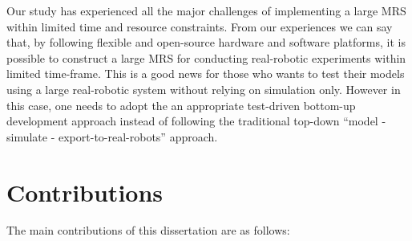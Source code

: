 Our study has experienced all the major challenges of implementing a large MRS within limited time and resource constraints. From our experiences we can say that, by following flexible and open-source hardware and software platforms, it is possible to construct a large MRS for conducting real-robotic experiments within limited time-frame. This is a good news for those who wants to test their models using a large real-robotic system without relying on simulation only. However in this case, one needs to adopt the an appropriate test-driven bottom-up development approach instead of following the traditional top-down ``model - simulate -  export-to-real-robots'' approach. 
\section{Contributions}
The main contributions of this dissertation are as follows:
